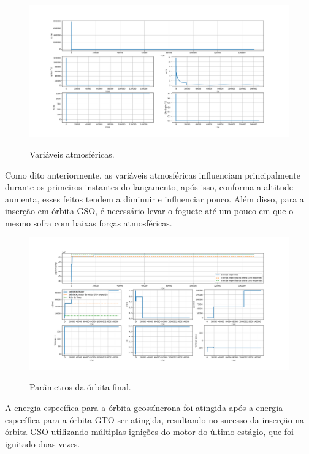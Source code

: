 \begin{figure}[H]
    \begin{center}
        \caption{Variáveis atmosféricas.}
        \includegraphics[width=6in]{figuras/Figure_4.png}
        \label{fig:3}
     \end{center}
\end{figure}

Como dito anteriormente, as variáveis atmosféricas influenciam principalmente durante os primeiros instantes do lançamento, após isso, conforma a altitude aumenta, esses feitos tendem a diminuir e influenciar pouco. Além disso, para a inserção em órbita GSO, é necessário levar o foguete até um pouco em que o mesmo sofra com baixas forças atmosféricas.

\begin{figure}[H]
    \begin{center}
        \caption{Parâmetros da órbita final.}
        \includegraphics[width=6in]{figuras/Figure_5.png}
        \label{fig:3}
     \end{center}
\end{figure}

A energia específica para a órbita geossíncrona foi atingida após a energia específica para a órbita GTO ser atingida, resultando no sucesso da inserção na órbita GSO utilizando múltiplas ignições do motor do último estágio, que foi ignitado duas vezes.


